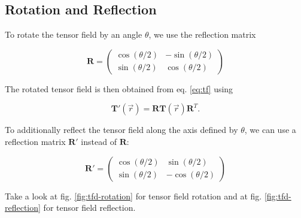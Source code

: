 \documentclass[a4paper,10pt,notitlepage]{scrartcl}
\newcommand{\mat}[1]{\mathbf{#1}}
\begin{document}
\subsection{Rotation and Reflection}

To rotate the tensor field by an angle $\theta$, we use the reflection matrix

\begin{equation}
 \mat{R} = \left( \begin{array}{cc}
            \cos(\theta/2) & -\sin(\theta/2) \\
            \sin(\theta/2) & \cos(\theta/2) \end{array}
\right)
\end{equation}

The rotated tensor field is then obtained from eq. \ref{eq:tf} using

\begin{equation}
 \mat{T}'(\vec{r}) = \mat{R} \mat{T}(\vec{r}) \mat{R}^T.
\end{equation}

To additionally reflect the tensor field along the axis defined by $\theta$, we
can use a reflection matrix $\mat{R}'$ instead of $\mat{R}$:

\begin{equation}
 \mat{R}' = \left( \begin{array}{cc}
            \cos(\theta/2) & \sin(\theta/2) \\
            \sin(\theta/2) & -\cos(\theta/2) \end{array}
\right)
\end{equation}

Take a look at fig. \ref{fig:tfd-rotation} for tensor field rotation and at
fig. \ref{fig:tfd-reflection} for tensor field reflection.
\end{document}

